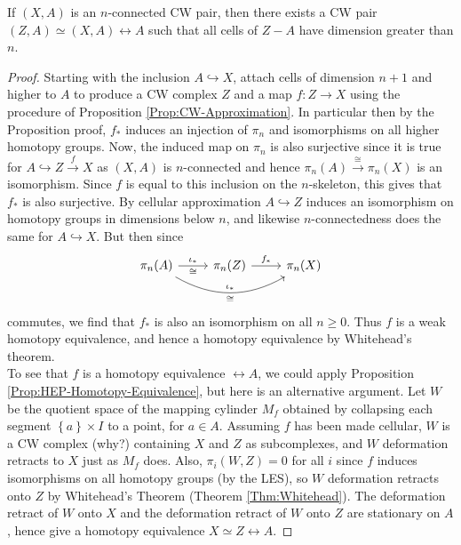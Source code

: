 \begin{proposition}[]\label{Prop:Removing-lower-dim-cells}
    If $\left( X,A \right) $ is an $n$-connected
    CW pair, then there exists a CW pair
    $\left( Z,A \right) \simeq \left( X,A \right) \rel A$ 
    such that all cells of $Z - A$ have dimension greater
    than $n$.
\end{proposition}

\begin{proof}
    Starting with the inclusion
    $A \hookrightarrow X$, attach cells of
    dimension $n+1$ and higher to
    $A$ to produce a CW complex $Z$ and
    a map $f \colon Z \to X$ using the
    procedure of Proposition \ref{Prop:CW-Approximation}.
    In particular then
    by the Proposition proof,
    $f_*$ induces an injection of
    $\pi_n$ and isomorphisms on all higher homotopy groups.
    Now, the induced map on $\pi_n$ is also
    surjective since it is true for
    $A \hookrightarrow Z \stackrel{f}{\to} X$ 
    as $\left( X,A \right) $ is $n$-connected and hence
    $\pi_n (A) \stackrel{\cong}{\to}  \pi_n(X)$ is an isomorphism.
    Since $f$ is equal to this inclusion on the
    $n$-skeleton, this gives that $f_*$ is also surjective.
    By cellular approximation
    $A \hookrightarrow Z$ induces an isomorphism
    on homotopy groups in dimensions below $n$, and
    likewise $n$-connectedness does the same for
    $A \hookrightarrow X$. But then since
    \begin{equation*}
    \begin{tikzcd}
        \pi_n (A) \ar[rr, bend right, "\iota_*",
        "\cong"'] 
        \ar[r, "\iota_*", "\cong"'] & 
        \pi_n (Z) \ar[r,"f_*"] & 
        \pi_n (X)
    \end{tikzcd}
    \end{equation*}
    commutes, we find that $f_*$ is also an
    isomorphism on all $n\ge 0$.
    Thus $f$ is a weak homotopy equivalence, and hence
    a homotopy equivalence by Whitehead's theorem.\\

    To see that $f$ is a homotopy equivalence
    $\rel A$, we could apply Proposition 
    \ref{Prop:HEP-Homotopy-Equivalence}, but
    here is an alternative argument. Let
    $W$ be the quotient space of the mapping cylinder
    $M_f$ obtained by collapsing each segment
    $\left\{ a \right\} \times I$ to a point, for
    $a \in A$. Assuming $f$ has been made cellular,
    $W$ is a CW complex (why?) containing $X$ and $Z$ as
    subcomplexes, and $W$ deformation retracts
    to $X$ just as $M_f$ does. Also,
    $\pi_i \left( W,Z \right) = 0$ for all
    $i$ since $f$ induces isomorphisms on all
    homotopy groups (by the LES), so $W$ deformation retracts
    onto $Z$ by Whitehead's Theorem (Theorem \ref{Thm:Whitehead}).
    The deformation retract of $W$ onto $X$ and the
    deformation retract of $W$ onto $Z$ are stationary
    on $A$, hence give a homotopy equivalence
    $X \simeq Z \rel A$.
\end{proof}

